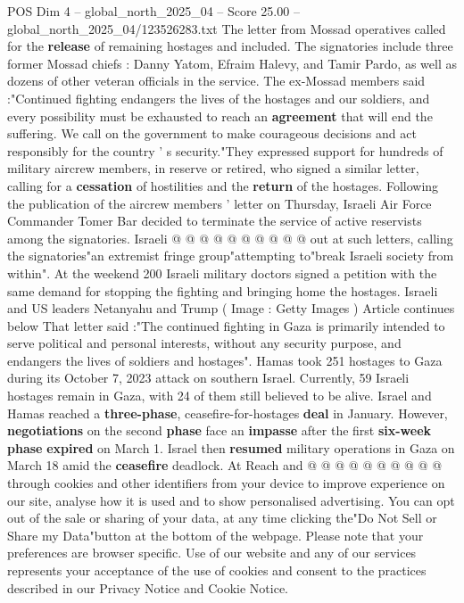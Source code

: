\begin{textsample}{POS Dim 4 – global\_north\_2025\_04 – Score 25.00 – global\_north\_2025\_04/123526283.txt}
The letter from Mossad operatives called for the \textbf{release} of remaining hostages and included.
The signatories include three former Mossad chiefs : Danny Yatom, Efraim Halevy, and Tamir Pardo, as well as dozens of other veteran officials in the service.
The ex-Mossad members said :"Continued fighting endangers the lives of the hostages and our soldiers, and every possibility must be exhausted to reach an \textbf{agreement} that will end the suffering.
We call on the government to make courageous decisions and act responsibly for the country ' s security."They expressed support for hundreds of military aircrew members, in reserve or retired, who signed a similar letter, calling for a \textbf{cessation} of hostilities and the \textbf{return} of the hostages.
Following the publication of the aircrew members ' letter on Thursday, Israeli Air Force Commander Tomer Bar decided to terminate the service of active reservists among the signatories.
Israeli @ @ @ @ @ @ @ @ @ @ out at such letters, calling the signatories"an extremist fringe group"attempting to"break Israeli society from within".
At the weekend 200 Israeli military doctors signed a petition with the same demand for stopping the fighting and bringing home the hostages.
Israeli and US leaders Netanyahu and Trump ( Image : Getty Images ) Article continues below That letter said :"The continued fighting in Gaza is primarily intended to serve political and personal interests, without any security purpose, and endangers the lives of soldiers and hostages".
Hamas took 251 hostages to Gaza during its October 7, 2023 attack on southern Israel.
Currently, 59 Israeli hostages remain in Gaza, with 24 of them still believed to be alive.
Israel and Hamas reached a \textbf{three-phase}, ceasefire-for-hostages \textbf{deal} in January.
However, \textbf{negotiations} on the second \textbf{phase} face an \textbf{impasse} after the first \textbf{six-week} \textbf{phase} \textbf{expired} on March 1.
Israel then \textbf{resumed} military operations in Gaza on March 18 amid the \textbf{ceasefire} deadlock.
At Reach and @ @ @ @ @ @ @ @ @ @ through cookies and other identifiers from your device to improve experience on our site, analyse how it is used and to show personalised advertising.
You can opt out of the sale or sharing of your data, at any time clicking the"Do Not Sell or Share my Data"button at the bottom of the webpage.
Please note that your preferences are browser specific.
Use of our website and any of our services represents your acceptance of the use of cookies and consent to the practices described in our Privacy Notice and Cookie Notice.

\end{textsample}

